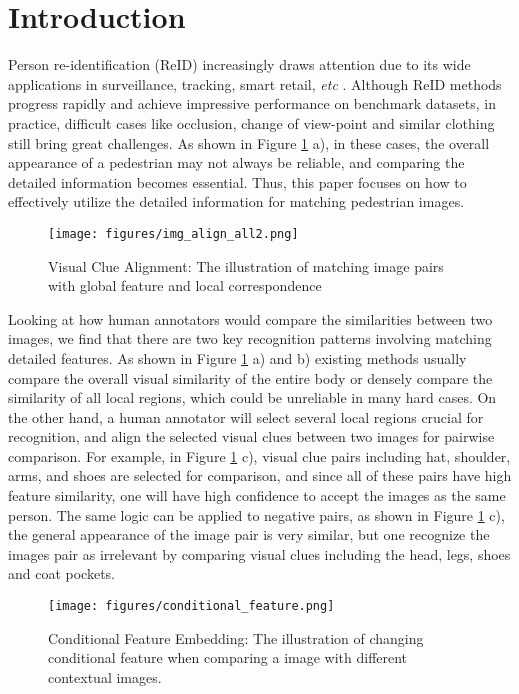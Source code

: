 \documentclass[final]{cvpr}
\begin{document}
\section{Introduction}


Person re-identification (ReID) 
increasingly draws attention due to its wide applications in surveillance, tracking, smart retail, \textit{etc} \cite{zheng2015scalable,Zhao_2017_ICCV,Sun_2018_ECCV}. 
Although ReID methods progress rapidly and achieve impressive performance on benchmark datasets, in practice, difficult cases like occlusion, change of view-point and similar clothing still bring great challenges. As shown in Figure \ref{fig_local_matching} a), in these cases, the overall appearance of a pedestrian may not always be reliable, and comparing the detailed information becomes essential. Thus, this paper focuses on how to effectively utilize the detailed information for matching pedestrian images. 

\begin{figure}[t]
\centering
\texttt{[image: figures/img\_align\_all2.png]} \caption{Visual Clue Alignment: The illustration of matching image pairs with global feature and local correspondence}
\label{fig_local_matching}
\end{figure}



Looking at how human annotators would compare the similarities between two images, we find that there are two key recognition patterns involving matching  detailed features. 
As shown in Figure \ref{fig_local_matching} a) and b) existing methods usually compare the overall visual similarity of the entire body or densely compare the similarity of all local regions, which could be  unreliable in many hard cases. On the other hand, a human annotator will select several local regions crucial for recognition, and align the selected visual clues between two images for pairwise comparison. 
For example, in Figure \ref{fig_local_matching} c), visual clue pairs including hat, shoulder, arms, and shoes are selected for comparison, and since all of these pairs have high feature similarity, one will  have high confidence to accept the images as the same person. The same logic can be applied to negative pairs, as shown in Figure \ref{fig_local_matching} c), the general appearance of the image pair is very similar, but one recognize the images pair as irrelevant by comparing visual clues including the head, legs, shoes and coat pockets. 

\begin{figure}[t]
\centering
\texttt{[image: figures/conditional\_feature.png]} \caption{Conditional Feature Embedding: The illustration of changing conditional feature when comparing a image with different contextual images. }
\label{fig_conditional_feature}
\end{figure}
\end{document}
